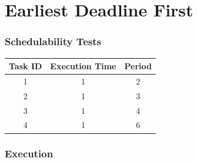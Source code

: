 \documentclass[xcolor=table]{beamer}
\begin{document}
\section{Earliest Deadline First}
\begin{frame}
\frametitle{Schedulability Tests}
\begin{table}[]
\begin{tabular}{|c|c|c|}
\hline
\textbf{Task ID} & \textbf{Execution Time} & \textbf{Period}\\ \hline
\cellcolor[HTML]{ECF6CE}1 &\cellcolor[HTML]{ECF6CE}1 &\cellcolor[HTML]{ECF6CE}2 \\ \hline
\cellcolor[HTML]{A4A4A4}2 &\cellcolor[HTML]{A4A4A4}1 &\cellcolor[HTML]{A4A4A4}3 \\ \hline
\cellcolor[HTML]{F781D8}3 &\cellcolor[HTML]{F781D8}1 &\cellcolor[HTML]{F781D8}4 \\ \hline
\cellcolor[HTML]{8181F7}4 &\cellcolor[HTML]{8181F7}1 &\cellcolor[HTML]{8181F7}6 \\ \hline
\end{tabular}
\end{table}
\end{frame}
\begin{frame}
\frametitle{Execution}
\begin{table}[]
\end{table}
\end{frame}
\end{document}
